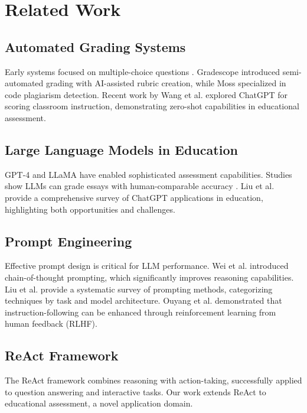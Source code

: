 \documentclass[runningheads]{llncs}
\begin{document}
\section{Related Work}

\subsection{Automated Grading Systems}
Early systems focused on multiple-choice questions \cite{burrows2015overview}. Gradescope \cite{singh2017gradescope} introduced semi-automated grading with AI-assisted rubric creation, while Moss \cite{schleimer2003winnowing} specialized in code plagiarism detection. Recent work by Wang et al. \cite{wang2023chatgpt} explored ChatGPT for scoring classroom instruction, demonstrating zero-shot capabilities in educational assessment.

\subsection{Large Language Models in Education}
GPT-4 \cite{openai2023gpt4} and LLaMA \cite{touvron2023llama} have enabled sophisticated assessment capabilities. Studies show LLMs can grade essays with human-comparable accuracy \cite{mizumoto2023chatgpt}. Liu et al. \cite{liu2023summary} provide a comprehensive survey of ChatGPT applications in education, highlighting both opportunities and challenges.

\subsection{Prompt Engineering}
Effective prompt design is critical for LLM performance. Wei et al. \cite{wei2022chain} introduced chain-of-thought prompting, which significantly improves reasoning capabilities. Liu et al. \cite{liu2023pre} provide a systematic survey of prompting methods, categorizing techniques by task and model architecture. Ouyang et al. \cite{ouyang2022training} demonstrated that instruction-following can be enhanced through reinforcement learning from human feedback (RLHF).

\subsection{ReAct Framework}
The ReAct framework \cite{yao2022react} combines reasoning with action-taking, successfully applied to question answering and interactive tasks. Our work extends ReAct to educational assessment, a novel application domain.
\end{document}
